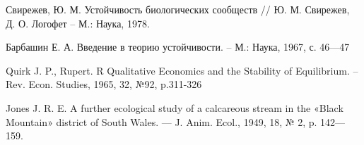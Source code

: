 \renewcommand{\refname}{\centering Список литературы}
\begin{thebibliography}{100}
    
        Свирежев, Ю. М. Устойчивость биологических сообществ // Ю. М. Свирежев, Д. О. Логофет -- М.: Наука, 1978.

        Барбашин Е. А. Введение в теорию устойчивости. -- М.: Наука, 1967, с. 46—47


    
        Quirk J. P., Rupert. R Qualitative Economics and the Stability of Equilibrium. -- Rev. Econ. Studies, 1965, 32, №92, p.311-326

        Jones J. R. E. A further ecological study of a calcareous stream in the «Black Mountain» district of South Wales. — J. Anim. Ecol., 1949, 18, № 2, p. 142—159.


\end{thebibliography}
